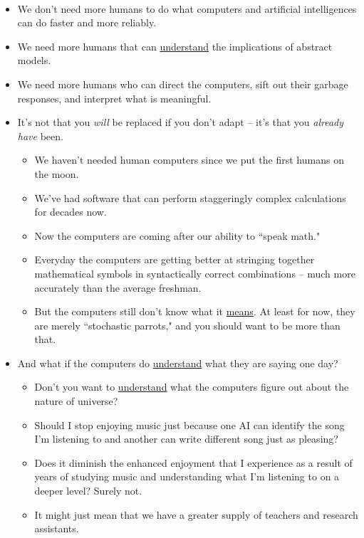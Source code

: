 \begin{remark}\,
\begin{itemize}
\item We don't need more humans to do what computers and artificial intelligences can do faster and more reliably.
\item We need more humans that can \underline{understand} the implications of abstract models. 
\item We need more humans who can direct the computers, sift out their garbage responses, and interpret what is meaningful.
\item It's not that you \textit{will} be replaced if you don't adapt -- it's that you \textit{already have} been.
\begin{itemize}
\item We haven't needed human computers since we put the first humans on the moon.
\item We've had software that can perform staggeringly complex calculations for decades now.
\item Now the computers are coming after our ability to ``speak math."
\item Everyday the computers are getting better at stringing together mathematical symbols in syntactically correct combinations -- much more accurately than the average freshman.
\item But the computers still don't know what it \underline{means}.  At least for now, they are merely ``stochastic parrots," and you should want to be more than that.
\end{itemize}

\item And what if the computers do \underline{understand} what they are saying one day?
\begin{itemize}
\item Don't you want to \underline{understand} what the computers figure out about the nature of universe?
\item Should I stop enjoying music just because one AI can identify the song I'm listening to and another can write different song just as pleasing?
\item Does it diminish the enhanced enjoyment that I experience as a result of years of studying music and understanding what I'm listening to on a deeper level?  Surely not.
\item It might just mean that we have a greater supply of teachers and research assistants.
\end{itemize}
\vfill

\end{itemize}
\end{remark}

